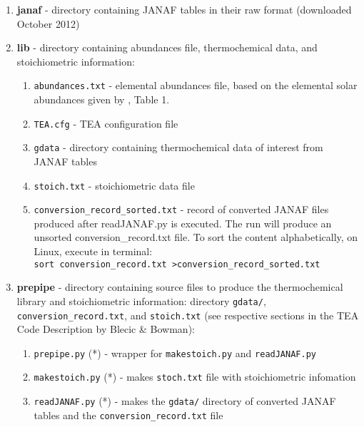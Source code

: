 {\begin{enumerate}
\item {\bf janaf } - directory containing JANAF tables in their raw
  format (downloaded October 2012)

\item {\bf lib } - directory containing abundances file,
  thermochemical data, and stoichiometric information:
\begin{enumerate}
\setlength\itemsep{0ex}
\setlength\topsep{0ex}
\setlength\partopsep{0ex}
\setlength\parsep{0ex}
\item \texttt{abundances.txt} - elemental abundances file, based on
  the elemental solar abundances given by
  \citet{AsplundEtal2009-SunAbundances}, Table 1.
\item \texttt{TEA.cfg} - TEA configuration file
\item \texttt{gdata} - directory containing thermochemical data of
  interest from JANAF tables
\item \texttt{stoich.txt} - stoichiometric data file
\item \texttt{conversion\_record\_sorted.txt} - record of converted
  JANAF files produced after readJANAF.py is executed. The run will
  produce an unsorted conversion\_record.txt file. To sort the content
  alphabetically, on Linux, execute in terminal: \\
  \texttt{sort conversion\_record.txt  >conversion\_record\_sorted.txt}
\end{enumerate}

\item {\bf prepipe } - directory containing source files to produce
  the thermochemical library and stoichiometric information: directory
  \texttt{gdata/}, \texttt{conversion\_record.txt}, and \newline
  \texttt{stoich.txt} (see respective sections in the TEA Code
  Description by Blecic \& Bowman):
\begin{enumerate}
\setlength\itemsep{0ex}
\setlength\topsep{0ex}
\setlength\partopsep{0ex}
\setlength\parsep{0ex}
\item \texttt{prepipe.py} (*) - wrapper for \texttt{makestoich.py} and
  \texttt{readJANAF.py}
\item \texttt{makestoich.py} (*) - makes \texttt{stoch.txt} file with
  stoichiometric infomation
\item \texttt{readJANAF.py} (*) - makes the \texttt{gdata/} directory
   of converted JANAF tables and the \texttt{conversion\_record.txt} file
\end{enumerate}


\end{enumerate}}
